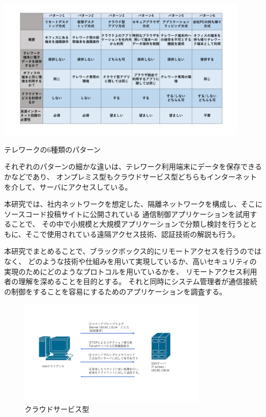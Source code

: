 \documentclass[12pt,a4paper,titlepage]{jreport}
\begin{document}
\begin{table}[h]
    \centering
    \includegraphics*[width=0.9\textwidth,page=1]{graphs/telework_list.pdf}
    \caption{テレワークの6種類のパターン}
    \label{telework_table}
\end{table}

それぞれのパターンの細かな違いは、テレワーク利用端末にデータを保存できるかなどであり、
オンプレミス型もクラウドサービス型どちらもインターネットを介して、サーバにアクセスしている。
\par 本研究では、社内ネットワークを想定した、隔離ネットワークを構成し、そこにソースコード投稿サイトに公開されている
通信制御アプリケーションを試用することで、
その中で小規模と大規模アプリケーションで分類し検討を行うとともに、そこで使用されている遠隔アクセス技術、認証技術の解説も行う。

本研究でまとめることで、ブラックボックス的にリモートアクセスを行うのではなく、
どのような技術や仕組みを用いて実現しているか、高いセキュリティの実現のためにどのようなプロトコルを用いているかを、
リモートアクセス利用者の理解を深めることを目的とする。
それと同時にシステム管理者が通信接続の制御をすることを容易にするためのアプリケーションを調査する。



\begin{figure}[h]
    \centering
    \includegraphics*[width=0.8\textwidth,page=14]{graphs/network_archtecture.pdf}
    \caption{ クラウドサービス型}
    \label{cloud_graph}
\end{figure}
\end{document}
